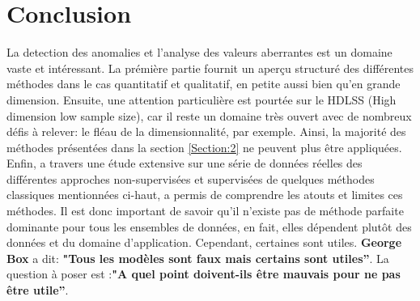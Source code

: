 
\section{Conclusion}
La detection des anomalies et l'analyse  des valeurs aberrantes est un domaine vaste et intéressant. La prémière partie fournit un aperçu structuré des différentes méthodes dans le cas quantitatif et qualitatif, en petite aussi bien qu'en grande dimension. Ensuite, une attention particulière est pourtée sur le HDLSS (High dimension low
sample size), car il reste un domaine très ouvert avec de nombreux défis à relever: le fléau de la dimensionnalité, par exemple. Ainsi, la majorité des méthodes présentées dans la section \ref{Section:2} ne peuvent plus être appliquées. 
Enfin, a travers une étude extensive sur une série de données réelles des différentes approches non-supervisées  et supervisées de quelques méthodes classiques  mentionnées ci-haut, a permis de comprendre les atouts et limites ces méthodes.  Il est  donc important de savoir qu'il n'existe pas de méthode parfaite dominante pour tous les ensembles de données, en fait, elles dépendent plutôt des données et du domaine d'application. Cependant, certaines sont utiles. \textbf{George Box} a dit: \textbf{"Tous les modèles sont faux mais certains sont utiles”}. La question à poser est :\textbf{"A quel point doivent-ils être mauvais pour ne pas être utile”}.


